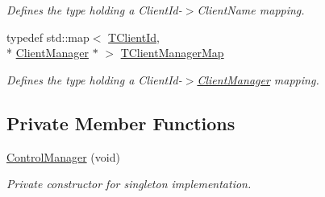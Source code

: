 \begin{DoxyCompactItemize}
\begin{DoxyCompactList}\small\item\em Defines the type holding a Client\-Id-\/$>$Client\-Name mapping. \end{DoxyCompactList}\item 
typedef std\-::map$<$ \hyperlink{class_control_manager_a1bff13cab35db39c43f81f49b56e4849}{T\-Client\-Id}, \\*
\hyperlink{class_client_manager}{Client\-Manager} $\ast$ $>$ \hyperlink{class_control_manager_a27b18022695359e2a4d5563f91b6befd}{T\-Client\-Manager\-Map}
\begin{DoxyCompactList}\small\item\em Defines the type holding a Client\-Id-\/$>$\hyperlink{class_client_manager}{Client\-Manager} mapping. \end{DoxyCompactList}\end{DoxyCompactItemize}
\subsection*{Private Member Functions}
\begin{DoxyCompactItemize}
\item 
\hyperlink{class_control_manager_ab81bac3e592705b7ca4b23ce473fe26e}{Control\-Manager} (void)
\begin{DoxyCompactList}\small\item\em Private constructor for singleton implementation. \end{DoxyCompactList}\end{DoxyCompactItemize}
